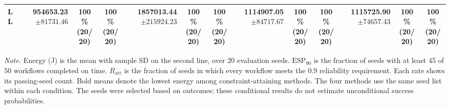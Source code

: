 \begin{table}[!t]
\begin{tabular}{@{}l*{4}{rcc}@{}}
LL & \shortstack[r]{\textbf{954653.23}\\$\pm 81731.46$} & \shortstack[c]{100\%\\(20/20)} & \shortstack[c]{100\%\\(20/20)} & \shortstack[r]{1857013.44\\$\pm 215924.23$} & \shortstack[c]{100\%\\(20/20)} & \shortstack[c]{100\%\\(20/20)} & \shortstack[r]{1114907.05\\$\pm 84717.67$} & \shortstack[c]{100\%\\(20/20)} & \shortstack[c]{100\%\\(20/20)} & \shortstack[r]{1115725.90\\$\pm 74657.43$} & \shortstack[c]{100\%\\(20/20)} & \shortstack[c]{100\%\\(20/20)} \\
\bottomrule
\end{tabular}
\par\vspace{3pt}
\parbox{\textwidth}{\footnotesize
\textit{Note.} Energy (J) is the mean with sample SD on the second line, over 20 evaluation seeds.
$\mathrm{ESP}_{90}$ is the fraction of seeds with at least 45 of 50 workflows completed on time.
$R_{\mathrm{att}}$ is the fraction of seeds in which every workflow meets the 0.9 reliability requirement.
Each rate shows its passing-seed count. Bold means denote the lowest energy among constraint-attaining methods.
The four methods use the same seed list within each condition.
The seeds were selected based on outcomes; these conditional results do not estimate unconditional success probabilities.}
\endgroup
\end{table}

